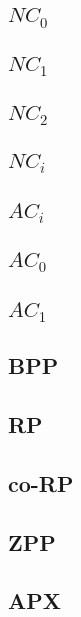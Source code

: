 \documentclass[]{article}
\theoremstyle{definition}
\begin{document}
\subsection{$NC_0$}

\subsection{$NC_1$}

\subsection{$NC_2$}

\subsection{$NC_i$}

\subsection{$AC_i$}

\subsection{$AC_0$}

\subsection{$AC_1$}

\subsection{BPP}

\subsection{RP}

\subsection{co-RP}

\subsection{ZPP}

\subsection{APX}
\end{document}
